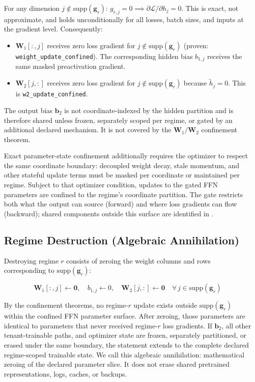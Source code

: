 \documentclass[11pt,a4paper]{article}
\newcommand{\bW}{\mathbf{W}}
\newcommand{\bg}{\mathbf{g}}
\newcommand{\cL}{\mathcal{L}}
\begin{document}
For any dimension $j \notin \mathrm{supp}(\bg_r)$:
$g_{r,j} = 0 \implies \partial \cL / \partial h_j = 0$.
This is exact, not approximate, and holds unconditionally
for all losses, batch sizes, and inputs at the gradient level.
Consequently:

\begin{itemize}[nosep]
    \item $\bW_1[:,j]$ receives zero loss gradient for
    $j \notin \mathrm{supp}(\bg_r)$ (proven:
    \texttt{weight\_update\_confined}).
    The corresponding hidden bias $b_{1,j}$ receives the same masked
    preactivation gradient.
    \item $\bW_2[j,:]$ receives zero loss gradient for
    $j \notin \mathrm{supp}(\bg_r)$ because $\tilde{h}_j = 0$.
    This is \texttt{w2\_update\_}\allowbreak\texttt{confined}.
\end{itemize}

The output bias $\mathbf{b}_2$ is not coordinate-indexed by the
hidden partition and is therefore shared unless frozen, separately
scoped per regime, or gated by an additional declared mechanism.  It
is not covered by the $\bW_1/\bW_2$ confinement theorem.

Exact parameter-state confinement additionally requires the
optimizer to respect the same coordinate boundary: decoupled
weight decay, stale momentum, and other stateful update terms must
be masked per coordinate or maintained per regime.  Subject to
that optimizer condition, updates to the gated FFN parameters are
confined to the regime's coordinate partition.  The
gate restricts both what the output can source (forward) and where
loss gradients can flow (backward); shared components outside this
surface are identified in .

\subsection{Regime Destruction (Algebraic Annihilation)}
\label{sec:destruction}

Destroying regime $r$ consists of zeroing the weight columns and
rows corresponding to $\mathrm{supp}(\bg_r)$:

\begin{equation}
    \bW_1[:,j] \leftarrow \mathbf{0}, \quad
    b_{1,j} \leftarrow 0, \quad
    \bW_2[j,:] \leftarrow \mathbf{0} \quad
    \forall\, j \in \mathrm{supp}(\bg_r)
\end{equation}

By the confinement theorems, no regime-$r$ update exists outside
$\mathrm{supp}(\bg_r)$ within the confined FFN parameter surface.
After zeroing, those parameters are identical to parameters that
never received regime-$r$ loss gradients.  If $\mathbf{b}_2$, all
other tenant-trainable paths, and optimizer state are frozen,
separately partitioned, or erased under the same boundary, the statement
extends to the complete declared regime-scoped trainable state.  We
call this algebraic annihilation: mathematical zeroing of the
declared parameter slice.  It does not erase shared pretrained
representations, logs, caches, or backups.
\end{document}
